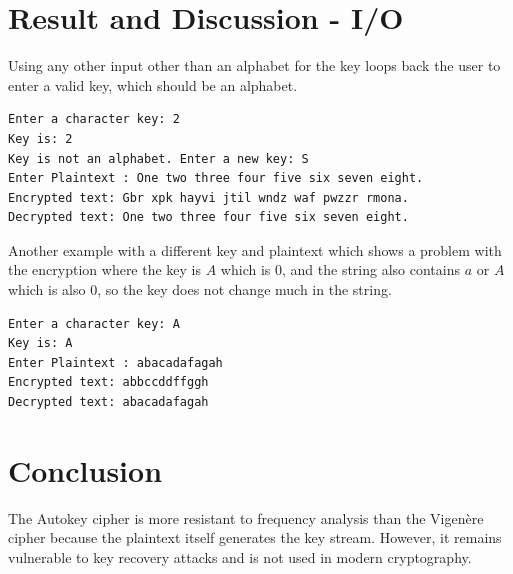 \section{Result and Discussion - I/O}
Using any other input other than an alphabet for the key loops back the user to enter a valid key, which should be an alphabet.
\begin{verbatim} 
Enter a character key: 2
Key is: 2
Key is not an alphabet. Enter a new key: S
Enter Plaintext : One two three four five six seven eight.
Encrypted text: Gbr xpk hayvi jtil wndz waf pwzzr rmona.
Decrypted text: One two three four five six seven eight.
\end{verbatim}
Another example with a different key and plaintext which shows a problem with the encryption where the key is $A$ which is 0, and the string also contains $a$ or $A$ which is also 0, so the key does not change much in the string.
\begin{verbatim}
Enter a character key: A
Key is: A
Enter Plaintext : abacadafagah                                
Encrypted text: abbccddffggh
Decrypted text: abacadafagah
\end{verbatim}

\section{Conclusion}
The Autokey cipher is more resistant to frequency analysis than the Vigen\`ere cipher because the plaintext itself generates the key stream. However, it remains vulnerable to key recovery attacks and is not used in modern cryptography.